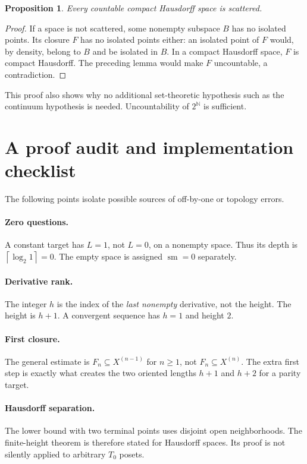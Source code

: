 \documentclass[11pt,letterpaper]{article}
\numberwithin{equation}{section}
\newtheorem{proposition}[proposition]{Proposition}
\theoremstyle{definition}
\theoremstyle{remark}
\theoremstyle{definition}
\newcommand{\sm}{\operatorname{sm}}
\newcommand{\ceil}[1]{\left\lceil#1\right\rceil}
\newcommand{\N}{\mathbb N}
\begin{document}
\begin{proposition}
Every countable compact Hausdorff space is scattered.
\end{proposition}
\begin{proof}
If a space is not scattered, some nonempty subspace $B$ has no isolated points.
Its closure $F$ has no isolated points either: an isolated point of $F$ would,
by density, belong to $B$ and be isolated in $B$. In a compact Hausdorff space,
$F$ is compact Hausdorff. The preceding lemma would make $F$ uncountable, a
contradiction.
\end{proof}

This proof also shows why no additional set-theoretic hypothesis such as the
continuum hypothesis is needed. Uncountability of $2^\N$ is sufficient.

\section{A proof audit and implementation checklist}

The following points isolate possible sources of off-by-one or topology errors.

\paragraph{Zero questions.}
A constant target has $L=1$, not $L=0$, on a nonempty space. Thus its depth is
$\ceil{\log_2 1}=0$. The empty space is assigned $\sm=0$ separately.

\paragraph{Derivative rank.}
The integer $h$ is the index of the \emph{last nonempty} derivative, not the
height. The height is $h+1$. A convergent sequence has $h=1$ and height $2$.

\paragraph{First closure.}
The general estimate is $F_n\subseteq X^{(n-1)}$ for $n\geq1$, not
$F_n\subseteq X^{(n)}$. The extra first step is exactly what creates the two
oriented lengths $h+1$ and $h+2$ for a parity target.

\paragraph{Hausdorff separation.}
The lower bound with two terminal points uses disjoint open neighborhoods.
The finite-height theorem is therefore stated for Hausdorff spaces. Its proof
is not silently applied to arbitrary $T_0$ posets.
\end{document}
